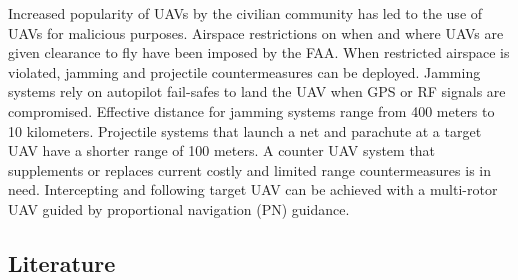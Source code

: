 \documentclass[conference]{IEEEtran}
\begin{document}
Increased popularity of UAVs by the civilian community has led to the use of UAVs for malicious purposes. Airspace restrictions on when and where UAVs are given clearance to fly have been imposed by the FAA. When restricted airspace is violated, jamming and projectile countermeasures can be deployed. Jamming systems rely on autopilot fail-safes to land the UAV when GPS or RF signals are compromised. Effective distance for jamming systems range from 400 meters to 10 kilometers. Projectile systems that launch a net and parachute at a target UAV have a shorter range of 100 meters. A counter UAV system that supplements or replaces current costly and limited range countermeasures is in need. Intercepting and following target UAV can be achieved with a multi-rotor UAV guided by proportional navigation (PN) guidance.

\subsection{Literature}







\end{document}
